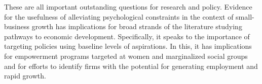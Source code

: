 \documentclass[11.5pt]{article}
\begin{document}
These are all important outstanding questions for research and policy. Evidence for the usefulness of alleviating psychological constraints in the context of small-business growth has implications for broad strands of the literature studying pathways to economic development.  
Specifically, it speaks to the importance of targeting policies using baseline levels of aspirations. In this, it has implications for empowerment programs targeted at women and marginalized social groups and for efforts to identify firms with the potential for generating employment and rapid growth. 




\end{document}
